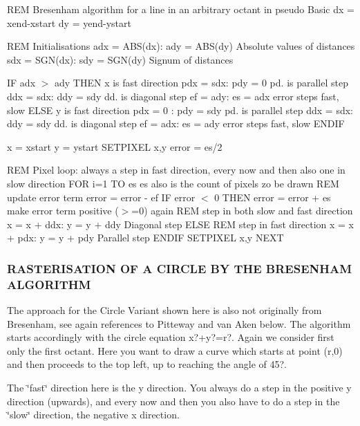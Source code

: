 R\+EM Bresenham algorithm for a line in an arbitrary octant in pseudo Basic dx = xend-\/xstart dy = yend-\/ystart

R\+EM Initialisations adx = A\+B\+S(dx)\+: ady = A\+B\+S(dy) \textquotesingle{} Absolute values of distances sdx = S\+G\+N(dx)\+: sdy = S\+G\+N(dy) \textquotesingle{} Signum of distances

IF adx $>$ ady T\+H\+EN \textquotesingle{} x is fast direction pdx = sdx\+: pdy = 0 \textquotesingle{} pd. is parallel step ddx = sdx\+: ddy = sdy \textquotesingle{} dd. is diagonal step ef = ady\+: es = adx \textquotesingle{} error steps fast, slow E\+L\+SE \textquotesingle{} y is fast direction pdx = 0 \+: pdy = sdy \textquotesingle{} pd. is parallel step ddx = sdx\+: ddy = sdy \textquotesingle{} dd. is diagonal step ef = adx\+: es = ady \textquotesingle{} error steps fast, slow E\+N\+D\+IF

x = xstart y = ystart S\+E\+T\+P\+I\+X\+EL x,y error = es/2

R\+EM Pixel loop\+: always a step in fast direction, every now and then also one in slow direction F\+OR i=1 TO es \textquotesingle{} es also is the count of pixels zo be drawn R\+EM update error term error = error -\/ ef IF error $<$ 0 T\+H\+EN error = error + es \textquotesingle{} make error term positive ($>$=0) again R\+EM step in both slow and fast direction x = x + ddx\+: y = y + ddy \textquotesingle{} Diagonal step E\+L\+SE R\+EM step in fast direction x = x + pdx\+: y = y + pdy \textquotesingle{} Parallel step E\+N\+D\+IF S\+E\+T\+P\+I\+X\+EL x,y N\+E\+XT

\subsubsection*{R\+A\+S\+T\+E\+R\+I\+S\+A\+T\+I\+ON OF A C\+I\+R\+C\+LE BY T\+HE B\+R\+E\+S\+E\+N\+H\+AM A\+L\+G\+O\+R\+I\+T\+HM}

The approach for the Circle Variant shown here is also not originally from Bresenham, see again references to Pitteway and van Aken below. The algorithm starts accordingly with the circle equation x?+y?=r?. Again we consider first only the first octant. Here you want to draw a curve which starts at point (r,0) and then proceeds to the top left, up to reaching the angle of 45?.

The \char`\"{}fast\char`\"{} direction here is the y direction. You always do a step in the positive y direction (upwards), and every now and then you also have to do a step in the \char`\"{}slow\char`\"{} direction, the negative x direction.

